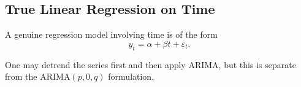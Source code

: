 \documentclass[12pt]{article}
\begin{document}
\subsection*{True Linear Regression on Time}

A genuine regression model involving time is of the form
\[
y_t = \alpha + \beta t + \varepsilon_t.
\]

One may detrend the series first and then apply ARIMA, but this is separate from the ARIMA$(p,0,q)$ formulation.






\end{document}
